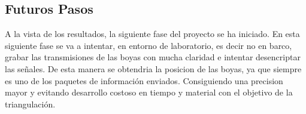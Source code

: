 \subsection{Futuros Pasos}

A la vista de los resultados, la siguiente fase del proyecto se ha iniciado. En esta siguiente fase se va a intentar, en entorno de laboratorio, es decir no en barco, grabar las transmisiones de las boyas con mucha claridad e intentar desencriptar las señales. De esta manera se obtendria la posicion de las boyas, ya que siempre es uno de los paquetes de información enviados. Consiguiendo una precision mayor y evitando desarrollo costoso en tiempo y material con el objetivo de la triangulación.
